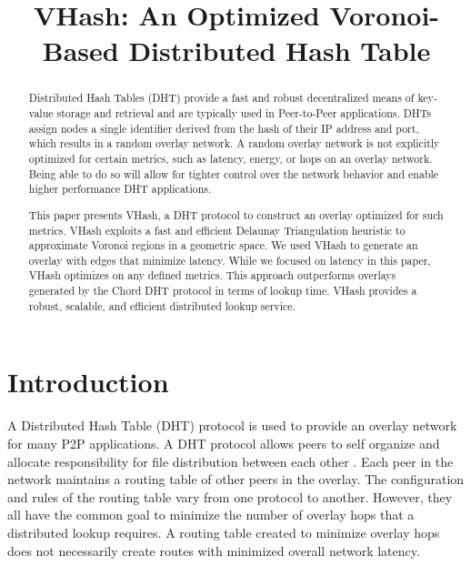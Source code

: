\documentclass[10pt, conference, letterpaper]{IEEEtran}
\title{VHash: An Optimized Voronoi-Based Distributed Hash Table}
\date{} %
\begin{document}
\maketitle

\begin{abstract}
Distributed Hash Tables (DHT) provide a fast and robust decentralized means of key-value storage and retrieval and are typically used in Peer-to-Peer applications.
DHTs assign nodes a single identifier derived from the hash of their IP address and port, which results in a random overlay network.   
A random overlay network is not explicitly optimized for certain metrics, such as latency, energy, or hops on an overlay network. 
Being able to do so will allow for tighter control over the network behavior and enable higher performance DHT applications.

This paper presents VHash, a DHT protocol to construct an overlay optimized for such metrics. 
VHash exploits a fast and efficient Delaunay Triangulation heuristic to approximate Voronoi regions in a geometric space. 
We used VHash to generate an overlay with edges that minimize latency. 
While we focused on latency in this paper, VHash optimizes on any defined metrics.
This approach outperforms overlays generated by the Chord DHT protocol in terms of lookup time.
VHash provides a robust, scalable, and efficient distributed lookup service.

\end{abstract}

\section{Introduction}
A Distributed Hash Table (DHT) protocol is used to provide an overlay network for many P2P applications. 
A DHT protocol allows peers to self organize and allocate responsibility for file distribution between each other \cite{bittorrent} \cite{kademlia} \cite{chord} \cite{pastry}.
Each peer in the network maintains a routing table of other peers in the overlay.
The configuration and rules of the routing table vary from one protocol to another.
However, they all have the common goal to minimize the number of overlay hops that a distributed lookup requires.
A routing table created to minimize overlay hops does not necessarily create routes with minimized overall network latency.
\end{document}
